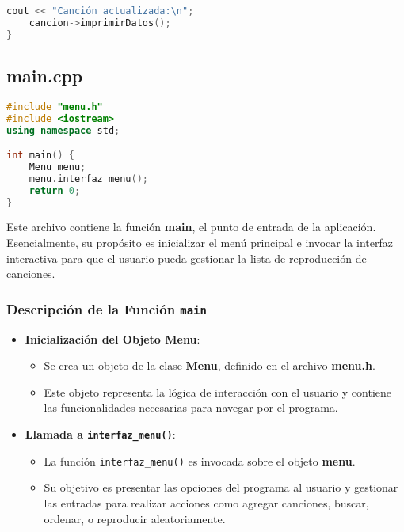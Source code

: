 \documentclass[12pt]{article}
\begin{document}
\begin{flushleft}
\begin{lstlisting}[language=C++, style=mystyle, caption={Cabecera de la Clase Menú}]
    cout << "Canción actualizada:\n";
    cancion->imprimirDatos();
}
            \end{lstlisting}
    
            \subsection{main.cpp}

            \begin{lstlisting}[language=C++, style=mystyle, caption={Código del main}]
#include "menu.h"
#include <iostream>
using namespace std;

int main() {
    Menu menu;
    menu.interfaz_menu();
    return 0;
}
            \end{lstlisting}

        \noindent\hspace*{4em}Este archivo contiene la función \textbf{main}, el punto de entrada de la aplicación. Esencialmente, su propósito es inicializar el menú principal e invocar la interfaz interactiva para que el usuario pueda gestionar la lista de reproducción de canciones.

        \subsubsection{Descripción de la Función \texttt{main}}
        
            \begin{itemize}[left=4em]
                \item \textbf{Inicialización del Objeto Menu}: 
                \begin{itemize}
                    \item Se crea un objeto de la clase \textbf{Menu}, definido en el archivo \textbf{menu.h}.
                    \item Este objeto representa la lógica de interacción con el usuario y contiene las funcionalidades necesarias para navegar por el programa.
                \end{itemize}
            
                \item \textbf{Llamada a \texttt{interfaz\_menu()}}:
                \begin{itemize}
                    \item La función \texttt{interfaz\_menu()} es invocada sobre el objeto \textbf{menu}.
                    \item Su objetivo es presentar las opciones del programa al usuario y gestionar las entradas para realizar acciones como agregar canciones, buscar, ordenar, o reproducir aleatoriamente.
                \end{itemize}
            

\end{itemize}
\end{flushleft}
\end{document}
